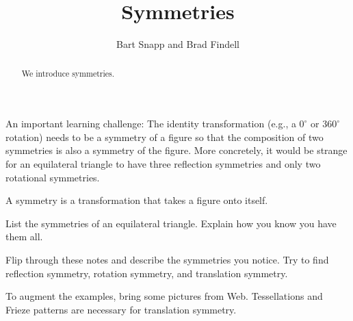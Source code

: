 \documentclass[nooutcomes]{ximera}
\title{Symmetries}
\author{Bart Snapp and Brad Findell}
\begin{document}
\begin{abstract}
  We introduce symmetries.
\end{abstract}
\maketitle

\begin{teachingnote}
An important learning challenge: The identity transformation (e.g., a $0^\circ$ or $360^\circ$ rotation) needs to be a symmetry of a figure so that the composition of two symmetries is also a symmetry of the figure.  More concretely, it would be strange for an equilateral triangle to have three reflection symmetries and only two rotational symmetries.
\end{teachingnote}

\begin{definition}
A symmetry is a transformation that takes a figure onto itself.  
\end{definition}
\begin{problem}
List the symmetries of an equilateral triangle.  Explain how you know you have them all.  
\vspace{1in}
\end{problem}

\begin{problem}
Flip through these notes and describe the symmetries you notice.  Try to find reflection symmetry, rotation symmetry, and translation symmetry.  
\end{problem}

\begin{teachingnote}
To augment the examples, bring some pictures from Web.   Tessellations and Frieze patterns are necessary for translation symmetry.  
\end{teachingnote}
\end{document}
